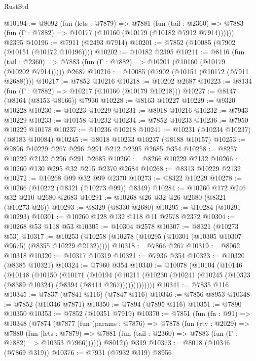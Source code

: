 \begin{lexlean}{RustStd}
\begin{coremodule}
@10194 := @8092
    (fun (lets : @7879) =>
    @7881
      (fun (tail : @2360) =>
      @7883 (fun (Γ : @7882) => @10177 (@10160 (@10179 (@10182 @7912 @7914))))))
    @2395
@10196 := @7911 (@2493 @7914)
@10201 := @7852 (@10085 (@7902 (@10151 (@10172 @10196))))
@10202 := @10182 @2395
@10211 := @8116
    (fun (tail : @2360) => @7883 (fun (Γ : @7882) => @10201 (@10160 (@10179 (@10202 @7914)))))
    @2687
@10216 := @10085 (@7902 (@10151 (@10172 (@7911 @2688))))
@10217 := @7852 @10216
@10218 := @10202 @2687
@10223 := @8134 (fun (Γ : @7882) => @10217 (@10160 (@10179 @10218)))
@10227 := @8147 (@8164 (@8153 @8166)) @7930
@10228 := @8163 @10227
@10229 := @9320 @10228
@10230 := @10223 @10229
@10231 := @8018 @10216
@10232 := @7943 @10229
@10233 := @10158 @10232
@10234 := @7852 @10233
@10236 := @7950 @10229 @10178
@10237 := @10236 @10218
@10241 := @10231 (@10234 @10237) (@8183 @10084)
@10245 := @8018 @10233 @10237 (@8188 @10157)
@10253 := @9896 @10229 @267 @296 @291 @212 @2395 @2685 @354
@10258 := @8257 @10229 @2132 @296 @291 @2685
@10260 := @8266 @10229 @2132
@10266 := @10260 @130 @295 @32 @215 @2370 @2684
@10268 := @8313 @10229 @2132
@10272 := @10268 @99 @32 @99 @2370
@10273 := @8322 @10229
@10278 := @10266 (@10272 (@8321 (@10273 @99)) @8349)
@10284 := @10260 @172 @246 @32 @210 @2680 @2683
@10291 := @10268 @26 @32 @26 @2680 (@8321 (@10273 @26))
@10293 := @8329 (@8330 @2680)
@10295 := @10284 (@10291 @10293)
@10301 := @10260 @128 @132 @118 @11 @2578 @2372
@10304 := @10268 @53 @118 @53
@10305 := @10304 @2578
@10307 := @8321 (@10273 @53)
@10317 := @10253 (@10258 (@10278 (@10295 (@10301 (@10305 @10307 @9675) (@8355 @10229 @2132)))))
@10318 := @7866 @267
@10319 := @8062 @10318
@10320 := @10317 @10319
@10321 := @7936 @354
@10323 := @10320 (@8385 @10321)
@10324 := @7960 @354
@10340 := @10078
    (@10104
      (@10146
        (@10148
          (@10150
            (@10171
              (@10194
                (@10211
                  (@10230 (@10241 (@10245 (@10323 (@8389 @10324) (@8394 (@8414 @267)))))))))))))
@10341 := @7835 @116
@10345 := @7837 (@7841 @116) (@7847 @116)
@10346 := @7856 @8953
@10348 := @7852 (@10346 @7871)
@10350 := @7894 (@7895 @116)
@10351 := @7890 @10350
@10353 := @7852 (@10351 @7919)
@10370 := @7851
    (fun (fn : @91) =>
    @10348
      (@7874
        (@7877
          (fun (params : @7876) =>
          @7878
            (fun (rty : @2029) =>
            @7880
              (fun (lets : @7879) =>
              @7881 (fun (tail : @2360) => @7883 (fun (Γ : @7882) => @10353 @7966))))))
        @8012))
    @319
@10373 := @8018 (@10346 (@7869 @319))
@10376 := @7931 (@7932 @319) @8956

\end{coremodule}
\end{lexlean}
